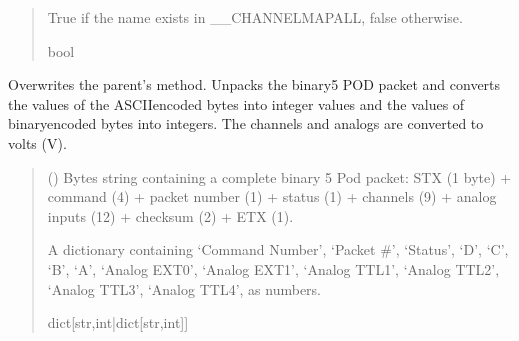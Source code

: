 \documentclass[letterpaper,10pt,english]{sphinxmanual}
\begin{document}
\begin{fulllineitems}
\begin{fulllineitems}
\begin{quote}
\begin{description}
\sphinxAtStartPar
True if the name exists in \_\_CHANNELMAPALL, false otherwise.

\sphinxAtStartPar
bool

\end{description}\end{quote}

\end{fulllineitems}


\begin{fulllineitems}
\label{\detokenize{PodDevice_8401HR:PodDevice_8401HR.POD_8401HR.TranslatePODpacket}}
\pysigstartsignatures
{}
\pysigstopsignatures
\sphinxAtStartPar
Overwrites the parent’s method. Unpacks the binary5 POD packet and converts the values of the         ASCII\sphinxhyphen{}encoded bytes into integer values and the values of binary\sphinxhyphen{}encoded bytes into integers. The         channels and analogs are converted to volts (V).
\begin{quote}\begin{description}
\sphinxAtStartPar
{} () \textendash{} Bytes string containing a complete binary 5 Pod packet: STX (1 byte)                 + command (4) + packet number (1) + status (1) + channels (9) + analog inputs (12)                 + checksum (2) + ETX (1).

\sphinxAtStartPar
A dictionary containing ‘Command Number’, ‘Packet \#’, ‘Status’,                 ‘D’, ‘C’, ‘B’, ‘A’, ‘Analog EXT0’,  ‘Analog EXT1’, ‘Analog TTL1’, ‘Analog TTL2’,                 ‘Analog TTL3’, ‘Analog TTL4’, as numbers.

\sphinxAtStartPar
dict{[}str,int|dict{[}str,int{]}{]}

\end{description}\end{quote}


\end{fulllineitems}
\end{fulllineitems}
\end{document}
